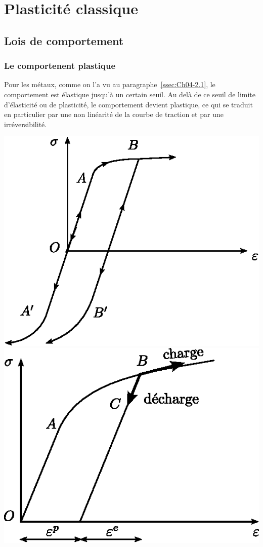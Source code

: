 \chapter{Plasticité classique} \label{chap:Ch10}
\section{Lois de comportement} \label{sec:Ch10-1}
\subsection{Le comportenent plastique} \label{ssec:Ch10-1.1}
Pour les métaux, comme on l'a vu au paragraphe~\ref{ssec:Ch04-2.1}, le comportement est élastique jusqu'à un certain seuil.
Au delà de ce seuil de limite d'élasticité ou de plasticité, le comportement devient plastique, ce qui se traduit en particulier par une non linéarité de la courbe de traction et par une irréversibilité.
\begin{multicols}{2}
    \centering
    \includegraphics{../images/T1_Ch10-01.eps}
    \columnbreak
    \includegraphics{../images/T1_Ch10-02.eps}
\end{multicols}

